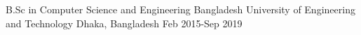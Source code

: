 

\begin{cventries}

  \cventry
    {B.Sc in Computer Science and Engineering} %
    {Bangladesh University of Engineering and Technology} %
    {Dhaka, Bangladesh} %
    {Feb 2015-Sep 2019} %
    {
    }


\end{cventries}
